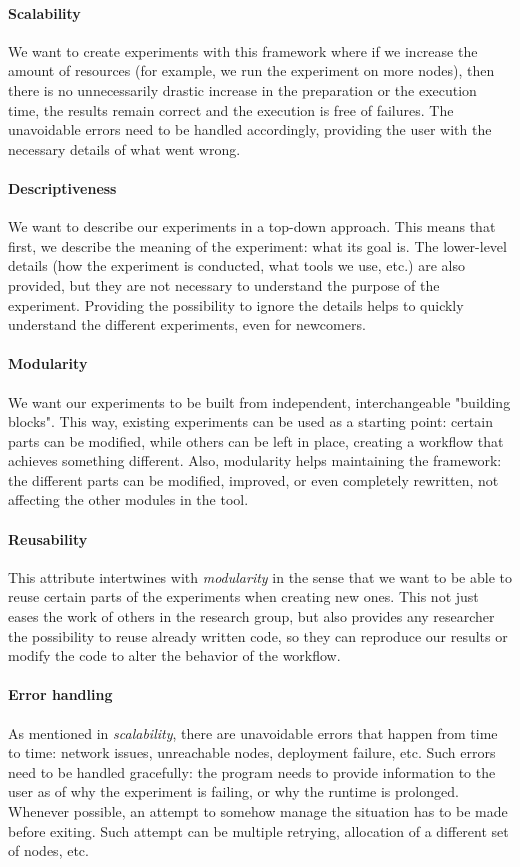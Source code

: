 \paragraph{Scalability}
We want to create experiments with this framework where if we increase
the amount of resources (for example, we run the experiment on more
nodes), then there is no unnecessarily drastic increase in the
preparation or the execution time, the results remain correct and the
execution is free of failures. The unavoidable errors need to be
handled accordingly, providing the user with the necessary details of
what went wrong.
\paragraph{Descriptiveness}
We want to describe our experiments in a top-down approach. This means
that first, we describe the meaning of the experiment: what its goal
is. The lower-level details (how the experiment is conducted, what
tools we use, etc.) are also provided, but they are not necessary to
understand the purpose of the experiment. Providing the possibility to
ignore the details helps to quickly understand the different
experiments, even for newcomers.
\paragraph{Modularity}
We want our experiments to be built from independent, interchangeable
"building blocks". This way, existing experiments can be used as a
starting point: certain parts can be modified, while others can be
left in place, creating a workflow that achieves something
different. Also, modularity helps maintaining the framework: the
different parts can be modified, improved, or even completely
rewritten, not affecting the other modules in the tool.
\paragraph{Reusability}
This attribute intertwines with \emph{modularity} in the sense that we
want to be able to reuse certain parts of the experiments when
creating new ones. This not just eases the work of others in the
research group, but also provides any researcher the possibility to
reuse already written code, so they can reproduce our results or
modify the code to alter the behavior of the workflow.
\paragraph{Error handling}
As mentioned in \emph{scalability}, there are unavoidable errors that
happen from time to time: network issues, unreachable nodes,
deployment failure, etc. Such errors need to be handled gracefully:
the program needs to provide information to the user as of why the
experiment is failing, or why the runtime is prolonged. Whenever
possible, an attempt to somehow manage the situation has to be made
before exiting. Such attempt can be multiple retrying, allocation of
a different set of nodes, etc.
